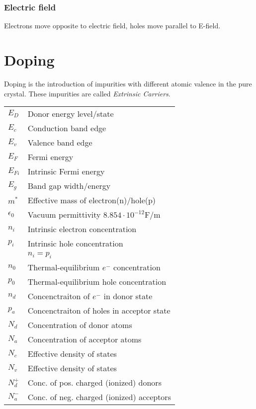 \documentclass[a4paper, fontsize=8pt, landscape, DIV=1]{scrartcl}
\begin{document}
\begin{multicols*}{4}
  \subsubsection{Electric field}
  Electrons move opposite to electric field, holes move parallel to E-field.

  \section{Doping}
  Doping is the introduction of impurities with different atomic valence in the pure crystal. These impurities are called \textit{Extrinsic Carriers}.


  \ifdefined\makeultracompact
  \else
  \begin{tabular}[h]{l l}
    $E_D$   & Donor energy level/state \\
    $E_c$   & Conduction band edge\\
    $E_v$   & Valence band edge\\
    $E_F$   & Fermi energy\\
    $E_{Fi}$   & Intrinsic Fermi energy\\
    $E_g$   & Band gap width/energy\\
    $m^*$   & Effective mass of electron(n)/hole(p) \\
    $\epsilon_0$ & Vacuum permittivity $8.854\cdot 10^{-12}$F/m\\
    $n_i$   & Intrinsic electron concentration \\
    $p_i$   & Intrinsic hole concentration\\
    {}      & $n_i=p_i$\\
    $n_0$   & Thermal-equilibrium $e^-$ concentration\\
    $p_0$   & Thermal-equilibrium hole concentration\\
    $n_d$   & Concenctraiton of $e^-$ in donor state \\
    $p_a$   & Concenctraiton of holes in acceptor state \\
    $N_d$   & Concentration of donor atoms\\
    $N_a$   & Concentration of acceptor atoms\\
    $N_c$   & Effective density of states\\
    $N_v$   & Effective density of states\\
    $N_d^+$   & Conc. of pos. charged (ionized) donors \\
    $N_a^-$   & Conc. of neg. charged (ionized) acceptors \\
  \end{tabular}
  \fi


\end{multicols*}
\end{document}
